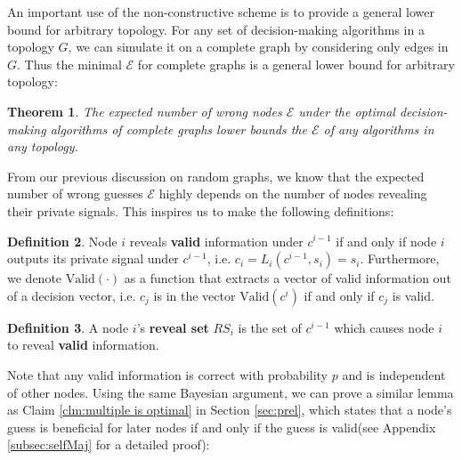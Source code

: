 \documentclass[a4paper,UKenglish]{lipics}
\newtheorem{thm}{Theorem}[section] %
\theoremstyle{definition}
\newtheorem{defn}[thm]{Definition}
\begin{document}
An important use of the non-constructive scheme is to provide a general lower bound for arbitrary topology.
For any set of decision-making algorithms in a topology $G$, we can simulate it on a complete graph by considering only edges in $G$.
Thus the minimal $\mathcal{E}$ for complete graphs is a general lower bound for arbitrary topology:

\begin{thm}
\label{thm:complete graphs bound}
The expected number of wrong nodes $\mathcal{E}$ under the optimal decision-making algorithms of complete graphs lower bounds the $\mathcal{E}$ of any algorithms in any topology.
\end{thm}

From our previous discussion on random graphs, we know that the expected number of wrong guesses $\mathcal{E}$ highly depends on the number of nodes revealing their private signals.
This inspires us to make the following definitions:
\begin{defn}
Node $i$ reveals \textbf{valid} information under $c^{i-1}$ 
	if and only if node $i$ outputs its private signal under $c^{i-1}$, 
	i.e. $c_i = L_i(c^{i-1}, s_i) = s_i$.
Furthermore, we denote $\text{Valid}(\cdot)$ as a function that extracts a vector of valid information out of a decision vector, i.e. 
	$c_j$ is in the vector $\text{Valid}(c^{i})$ if and only if $c_j$ is valid.
\end{defn}

\begin{defn}
A node $i$'s \textbf{reveal set} $RS_i$ is the set of $c^{i-1}$ which causes node $i$ to reveal \textbf{valid} information.
\end{defn}


Note that any valid information is correct with probability $p$ and is independent of other nodes. Using the same Bayesian argument\cite{easley2010networks}, we can prove a similar lemma as Claim \ref{clm:multiple is optimal} in Section \ref{sec:prel}, which states that a node's guess is beneficial for later nodes if and only if the guess is valid(see Appendix \ref{subsec:selfMaj} for a detailed proof):
\end{document}
